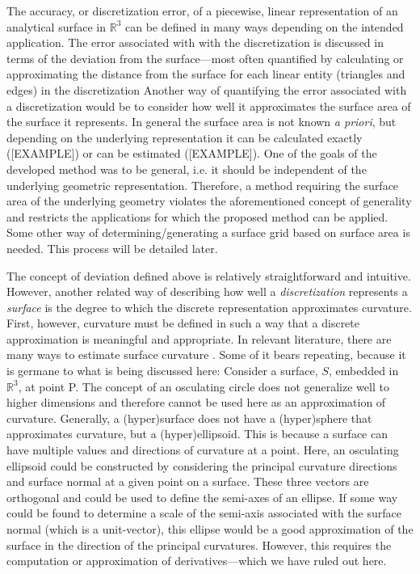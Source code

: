 The accuracy, or discretization error, of a piecewise, linear
representation of an analytical surface in ${\mathbb R}^3$ can be
defined in many ways depending on the intended application. The error
associated with with the discretization is discussed in terms of the
deviation from the surface---most often quantified by calculating or
approximating the distance from the surface for each linear entity
(triangles and edges) in the discretization Another way of quantifying
the error associated with a discretization would be to consider how well
it approximates the surface area of the surface it represents. In
general the surface area is not known {\it a priori}, but depending on
the underlying representation it can be calculated exactly ([EXAMPLE])
or can be estimated ([EXAMPLE]).  One of the goals of the developed
method was to be general, i.e. it should be independent of the
underlying geometric representation.  Therefore, a method requiring the
surface area of the underlying geometry violates the aforementioned
concept of generality and restricts the applications for which the
proposed method can be applied. Some other way of determining/generating
a surface grid based on surface area is needed. This process will be
detailed later.

The concept of deviation defined above is relatively straightforward and
intuitive. However, another related way of describing how well a
\textit{discretization} represents a \textit{surface} is the degree to
which the discrete representation approximates curvature. First,
however, curvature must be defined in such a way that a discrete
approximation is meaningful and appropriate.  In relevant literature,
there are many ways to estimate surface curvature \cite{hermann07}. Some
of it bears repeating, because it is germane to what is being discussed
here: Consider a surface, $S$, embedded in ${\mathbb R}^3$, at point P.
The concept of an osculating circle \cite{weissteineOsculatingCircle}
does not generalize well to higher dimensions and therefore cannot be
used here as an approximation of curvature.  Generally, a (hyper)surface
does not have a (hyper)sphere that approximates curvature, but a
(hyper)ellipsoid. This is because a surface can have multiple values and
directions of curvature at a point.  Here, an osculating ellipsoid could
be constructed by considering the principal curvature directions and
surface normal at a given point on a surface. These three vectors are
orthogonal and could be used to define the semi-axes of an ellipse. If
some way could be found to determine a scale of the semi-axis associated
with the surface normal (which is a unit-vector), this ellipse would be
a good approximation of the surface in the direction of the principal
curvatures. However, this requires the computation or approximation of
derivatives---which we have ruled out here.


